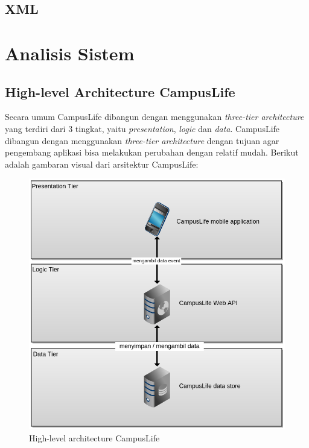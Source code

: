 \documentclass[a4paper, 12pt]{report}
\begin{document}
\section{XML}

\chapter{Analisis Sistem}
\section{High-level Architecture CampusLife}
\onehalfspacing Secara umum CampusLife dibangun dengan menggunakan \textit{three-tier architecture} yang terdiri dari 3 tingkat, yaitu \textit{presentation}, \textit{logic} dan \textit{data}. CampusLife dibangun dengan menggunakan \textit{three-tier architecture} dengan tujuan agar pengembang aplikasi bisa melakukan perubahan dengan relatif mudah. Berikut adalah gambaran visual dari arsitektur CampusLife:

\begin{figure}[htp]
\centering
\includegraphics[scale=0.40]{images/test.png}
\caption{High-level architecture CampusLife}
\label{High-level architecture CampusLife}
\end{figure}
\end{document}
